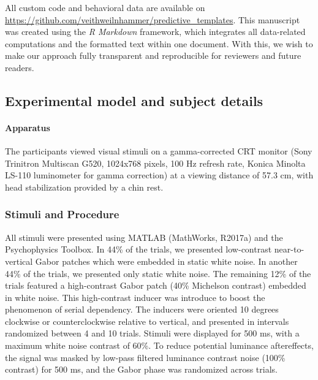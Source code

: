 \documentclass[
]{article}
\begin{document}
All custom code and behavioral data are available on
\url{https://github.com/veithweilnhammer/predictive_templates}. This
manuscript was created using the \emph{R Markdown} framework, which
integrates all data-related computations and the formatted text within
one document. With this, we wish to make our approach fully transparent
and reproducible for reviewers and future readers.

\hypertarget{experimental-model-and-subject-details}{%
\subsection{Experimental model and subject
details}\label{experimental-model-and-subject-details}}

\hypertarget{apparatus}{%
\paragraph{Apparatus}\label{apparatus}}

The participants viewed visual stimuli on a gamma-corrected CRT monitor
(Sony Trinitron Multiscan G520, 1024x768 pixels, 100 Hz refresh rate,
Konica Minolta LS-110 luminometer for gamma correction) at a viewing
distance of 57.3 cm, with head stabilization provided by a chin rest.

\hypertarget{stimuli-and-procedure}{%
\subsubsection{Stimuli and Procedure}\label{stimuli-and-procedure}}

All stimuli were presented using MATLAB (MathWorks, R2017a) and the
Psychophysics Toolbox. In 44\% of the trials, we presented low-contrast
near-to-vertical Gabor patches which were embedded in static white
noise. In another 44\% of the trials, we presented only static white
noise. The remaining 12\% of the trials featured a high-contrast Gabor
patch (40\% Michelson contrast) embedded in white noise. This
high-contrast inducer was introduce to boost the phenomenon of serial
dependency. The inducers were oriented 10 degrees clockwise or
counterclockwise relative to vertical, and presented in intervals
randomized between 4 and 10 trials. Stimuli were displayed for 500 ms,
with a maximum white noise contrast of 60\%. To reduce potential
luminance aftereffects, the signal was masked by low-pass filtered
luminance contrast noise (100\% contrast) for 500 ms, and the Gabor
phase was randomized across trials.
\end{document}
